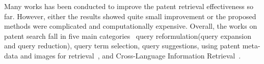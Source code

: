 \begin{comment}
A patent is a set of exclusive rights granted to an inventor to protect their invention for a limited period of time. An important requirement for a patent to be granted is that the invention, it describes, is novel which means there is no earlier patent, publication or public communication of a similar idea. To ensure the novelty of an invention, patent offices as well as other Intellectual Property (IP) service providers mainly perform a search called `prior art search'. The purpose of `prior art search' is finding all relevant patents which may put the patent application at the risk of novelty invalidation or at least have common parts with patent application and should be cited~\cite{magdy2012toward}~\cite{piroi2013overview}. 

Patent retrieval has three main characteristics which makes it difficult compared to other IR applications: (1) the search starts with a query as long as a full patent application that helps users --usually patent examiners, inventors, or lawyers-- avoid spending long hours to formulate a query; (2) it is recall-oriented, where not missing relevant documents is more important than appearing relevant documents at top of the list; (3) unlike the web application in which authors tend to highlight their work to be easily found through search engines, authors of the patents prefer to use a vague language to avoid the invalidation of their idea.     
\end{comment}

Many works has been conducted to improve the patent retrieval effectiveness so far. However, either the results showed quite small improvement or the proposed methods were complicated and computationally expensive. Overall, the works on patent search fall in five main categories~\cite{lupu2013patent} query reformulation(query expansion and query reduction), query term selection, query suggestions, using patent meta-data and images for retrieval~\cite{lupu2013evaluating}, and Cross-Language Information Retrieval~\cite{magdy2014studying}.

